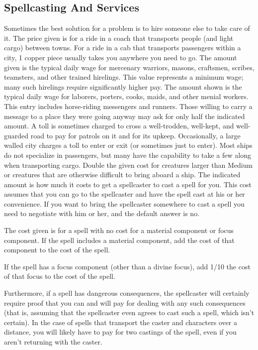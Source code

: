     \subsection{Spellcasting And Services}
        Sometimes the best solution for a problem is to hire someone else to take care of it.
         The price given is for a ride in a coach that transports people (and light cargo) between towns. For a ride in a cab that transports passengers within a city, 1 copper piece usually takes you anywhere you need to go.
         The amount given is the typical daily wage for mercenary warriors, masons, craftsmen, scribes, teamsters, and other trained hirelings. This value represents a minimum wage; many such hirelings require significantly higher pay.
         The amount shown is the typical daily wage for laborers, porters, cooks, maids, and other menial workers.
         This entry includes horse-riding messengers and runners. Those willing to carry a message to a place they were going anyway may ask for only half the indicated amount.
         A toll is sometimes charged to cross a well-trodden, well-kept, and well-guarded road to pay for patrols on it and for its upkeep. Occasionally, a large walled city charges a toll to enter or exit (or sometimes just to enter).
         Most ships do not specialize in passengers, but many have the capability to take a few along when transporting cargo. Double the given cost for creatures larger than Medium or creatures that are otherwise difficult to bring aboard a ship.
         The indicated amount is how much it costs to get a spellcaster to cast a spell for you. This cost assumes that you can go to the spellcaster and have the spell cast at his or her convenience. If you want to bring the spellcaster somewhere to cast a spell you need to negotiate with him or her, and the default answer is no.
        \par The cost given is for a spell with no cost for a material component or focus component. If the spell includes a material component, add the cost of that component to the cost of the spell.
        \par If the spell has a focus component (other than a divine focus), add 1/10 the cost of that focus to the cost of the spell.
        \par Furthermore, if a spell has dangerous consequences, the spellcaster will certainly require proof that you can and will pay for dealing with any such consequences (that is, assuming that the spellcaster even agrees to cast such a spell, which isn't certain). In the case of spells that transport the caster and characters over a distance, you will likely have to pay for two castings of the spell, even if you aren't returning with the caster.

